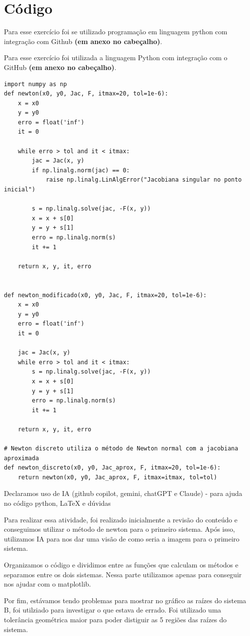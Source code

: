 \section{Código}
Para esse exercício foi se utilizado programação em linguagem python com integração com Github \textbf{(em anexo no cabeçalho)}.

Para esse exercício foi utilizada a linguagem Python com integração com o GitHub \textbf{(em anexo no cabeçalho)}.

\begin{lstlisting}[caption={Métodos de Newton, Newton Modificado e Newton Discreto}, label={lst:newtons}]
import numpy as np
def newton(x0, y0, Jac, F, itmax=20, tol=1e-6):
    x = x0
    y = y0
    erro = float('inf')
    it = 0

    while erro > tol and it < itmax:
        jac = Jac(x, y)
        if np.linalg.norm(jac) == 0:
            raise np.linalg.LinAlgError("Jacobiana singular no ponto inicial")

        s = np.linalg.solve(jac, -F(x, y))
        x = x + s[0]
        y = y + s[1]
        erro = np.linalg.norm(s)
        it += 1

    return x, y, it, erro


def newton_modificado(x0, y0, Jac, F, itmax=20, tol=1e-6):
    x = x0
    y = y0
    erro = float('inf')
    it = 0

    jac = Jac(x, y)
    while erro > tol and it < itmax:
        s = np.linalg.solve(jac, -F(x, y))
        x = x + s[0]
        y = y + s[1]
        erro = np.linalg.norm(s)
        it += 1

    return x, y, it, erro

# Newton discreto utiliza o método de Newton normal com a jacobiana aproximada
def newton_discreto(x0, y0, Jac_aprox, F, itmax=20, tol=1e-6):
    return newton(x0, y0, Jac_aprox, F, itmax=itmax, tol=tol)
\end{lstlisting}
Declaramos uso de IA (github copilot, gemini, chatGPT e Claude) - para ajuda no código python, LaTeX e dúvidas

Para realizar essa atividade, foi realizado inicialmente a revisão do conteúdo e conseguimos utilizar o método de newton para o primeiro sistema. Após isso, utilizamos IA para nos dar uma visão de como seria a imagem para o primeiro sistema.

Organizamos o código e dividimos entre as funções que calculam os métodos e separamos entre os dois sistemas. Nessa parte utilizamos apenas para conseguir nos ajudar com o matplotlib.

Por fim, estávamos tendo problemas para mostrar no gráfico as raízes do sistema B, foi utilziado para investigar o que estava de errado. Foi utilizado uma tolerância geométrica maior para poder distiguir as 5 regiões das raízes do sistema.